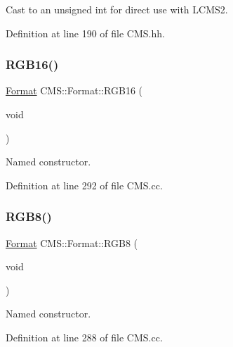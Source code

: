 Cast to an unsigned int for direct use with L\+C\+M\+S2. 



Definition at line 190 of file C\+M\+S.\+hh.

\mbox{\label{class_c_m_s_1_1_format_aca9c530080478b9cc9807d987b036ad4}} 
\subsubsection{\texorpdfstring{R\+G\+B16()}{RGB16()}}
{\footnotesize\ttfamily \hyperlink{class_c_m_s_1_1_format}{Format} C\+M\+S\+::\+Format\+::\+R\+G\+B16 (\begin{DoxyParamCaption}\item[{void}]{ }\end{DoxyParamCaption})\hspace{0.3cm}{\ttfamily [static]}}



Named constructor. 



Definition at line 292 of file C\+M\+S.\+cc.

\mbox{\label{class_c_m_s_1_1_format_a1f6bc07fa0229b02f25ec98b72c92ea1}} 
\subsubsection{\texorpdfstring{R\+G\+B8()}{RGB8()}}
{\footnotesize\ttfamily \hyperlink{class_c_m_s_1_1_format}{Format} C\+M\+S\+::\+Format\+::\+R\+G\+B8 (\begin{DoxyParamCaption}\item[{void}]{ }\end{DoxyParamCaption})\hspace{0.3cm}{\ttfamily [static]}}



Named constructor. 



Definition at line 288 of file C\+M\+S.\+cc.

\mbox{\label{class_c_m_s_1_1_format_a289beec4f2ae6b88c198c4d96364d6c3}} 
